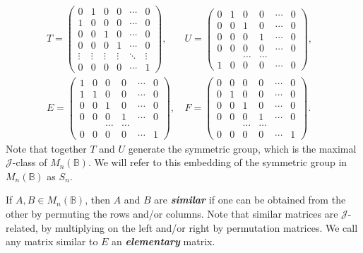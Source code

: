 \documentclass[11pt]{article}
\newcommand{\defn}[1]{\textbf{\textit{#1}}}
\numberwithin{equation}{section}
\newcommand{\B}{\mathbb{B}}
\newcommand{\Bn}{M_n(\B)}
\newcommand{\J}{\mathscr{J}}
\begin{document}
\begin{align*}
  T = \begin{pmatrix}
    0 & 1 & 0 & 0 & \cdots & 0 \\
    1 & 0 & 0 & 0 & \cdots & 0 \\
    0 & 0 & 1 & 0 & \cdots & 0 \\
    0 & 0 & 0 & 1 & \cdots & 0 \\
    \vdots  & \vdots & \vdots & \vdots & \ddots & \vdots\\
    0 & 0 & 0 & 0 & \cdots & 1 
  \end{pmatrix}\text{, }&
  U = \begin{pmatrix}
    0 & 1 & 0 & 0 & \cdots & 0 \\
    0 & 0 & 1 & 0 & \cdots & 0 \\
    0 & 0 & 0 & 1 & \cdots & 0 \\
    0 & 0 & 0 & 0 & \cdots & 0 \\
      &   &   \dots & \dots & \\
    1 & 0 & 0 & 0 & \cdots & 0 
  \end{pmatrix},&\\
  E = \begin{pmatrix}
    1 & 0 & 0 & 0 & \cdots & 0 \\
    1 & 1 & 0 & 0 & \cdots & 0 \\
    0 & 0 & 1 & 0 & \cdots & 0 \\
    0 & 0 & 0 & 1 & \cdots & 0 \\
      &   &   \dots & \dots & \\
    0 & 0 & 0 & 0 & \cdots & 1 
  \end{pmatrix}\text{, }&
  F = \begin{pmatrix}
    0 & 0 & 0 & 0 & \cdots & 0 \\
    0 & 1 & 0 & 0 & \cdots & 0 \\
    0 & 0 & 1 & 0 & \cdots & 0 \\
    0 & 0 & 0 & 1 & \cdots & 0 \\
      &   &   \dots & \dots & \\
    0 & 0 & 0 & 0 & \cdots & 1
  \end{pmatrix}.
\end{align*}
Note that together $T$ and $U$ generate the symmetric group, which is the
maximal $\J$-class of $\Bn$. We will refer to this embedding of the symmetric
group in $\Bn$ as $S_n$.

If $A, B\in \Bn$, then $A$ and $B$ are \defn{similar} if one can be obtained
from the other by permuting the rows and/or columns. Note that similar matrices
are $\J$-related, by multiplying on the left and/or right by permutation
matrices.
We call any matrix similar to $E$ an \defn{elementary} matrix.
\end{document}

